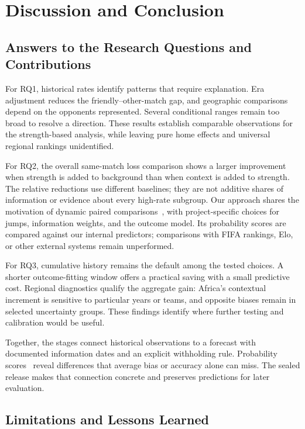 \section{Discussion and Conclusion}
\subsection{Answers to the Research Questions and Contributions}

For RQ1, historical rates identify patterns that require explanation. Era adjustment reduces the friendly--other-match gap, and geographic comparisons depend on the opponents represented. Several conditional ranges remain too broad to resolve a direction. These results establish comparable observations for the strength-based analysis, while leaving pure home effects and universal regional rankings unidentified.

For RQ2, the overall same-match loss comparison shows a larger improvement when strength is added to background than when context is added to strength. The relative reductions use different baselines; they are not additive shares of information or evidence about every high-rate subgroup. Our approach shares the motivation of dynamic paired comparisons~\citep{glickman1999dynamic}, with project-specific choices for jumps, information weights, and the outcome model. Its probability scores are compared against our internal predictors; comparisons with FIFA rankings, Elo, or other external systems remain unperformed.

For RQ3, cumulative history remains the default among the tested choices. A shorter outcome-fitting window offers a practical saving with a small predictive cost. Regional diagnostics qualify the aggregate gain: Africa's contextual increment is sensitive to particular years or teams, and opposite biases remain in selected uncertainty groups. These findings identify where further testing and calibration would be useful.

Together, the stages connect historical observations to a forecast with documented information dates and an explicit withholding rule. Probability scores~\citep{gneiting2007scoring} reveal differences that average bias or accuracy alone can miss. The sealed release makes that connection concrete and preserves predictions for later evaluation.

\subsection{Limitations and Lessons Learned}

